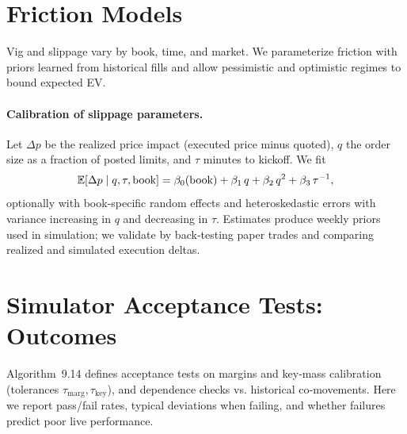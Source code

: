 \section{Friction Models}
Vig and slippage vary by book, time, and market. We parameterize friction with priors learned from historical fills and allow pessimistic and optimistic regimes to bound expected EV.

\paragraph{Calibration of slippage parameters.}
Let $\Delta p$ be the realized price impact (executed price minus quoted), $q$ the order size as a fraction of posted limits, and $\tau$ minutes to kickoff. We fit
\[\mathbb{E}[\Delta p\mid q,\tau,\text{book}]=\beta_0(\text{book})+\beta_1\,q+\beta_2\,q^2+\beta_3\,\tau^{-1},\]
optionally with book‑specific random effects and heteroskedastic errors with variance increasing in $q$ and decreasing in $\tau$. Estimates produce weekly priors used in simulation; we validate by back‑testing paper trades and comparing realized and simulated execution deltas.


\section{Simulator Acceptance Tests: Outcomes}\label{sec:sim-acceptance-outcomes}
Algorithm~9.14 defines acceptance tests on margins and key‑mass calibration (tolerances $\tau_{\mathrm{marg}},\tau_{\mathrm{key}}$), and dependence checks vs. historical co‑movements. Here we report pass/fail rates, typical deviations when failing, and whether failures predict poor live performance.


